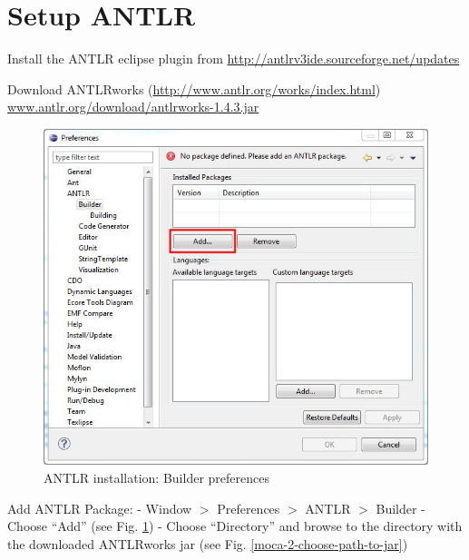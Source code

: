 \section{Setup ANTLR}

Install the ANTLR eclipse plugin from \url{http://antlrv3ide.sourceforge.net/updates}

Download ANTLRworks (\url{http://www.antlr.org/works/index.html})
\url{www.antlr.org/download/antlrworks-1.4.3.jar}

\begin{figure}[!htbp]
\begin{center}
 \includegraphics[width=\textwidth]{pics/moca/0Install/1-antlr-package}
  \caption{ANTLR installation: Builder preferences}
  \label{moca-1-antlr-package}
\end{center}
\end{figure}

Add ANTLR Package:
- Window $>$ Preferences $>$ ANTLR $>$ Builder 
- Choose ``Add'' (see Fig. \ref{moca-1-antlr-package})
- Choose ``Directory'' and browse to the directory with the downloaded
ANTLRworks jar (see Fig. \ref{moca-2-choose-path-to-jar})

